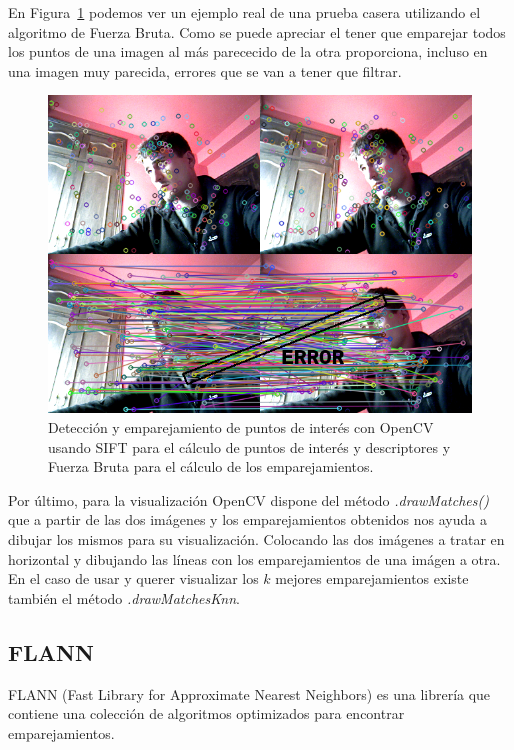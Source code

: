 En Figura~\ref{fig:SiftDetector} podemos ver un ejemplo real de una prueba casera utilizando el algoritmo de Fuerza Bruta. Como se puede apreciar el tener que emparejar todos los puntos de una imagen al más parececido de la otra proporciona, incluso en una imagen muy parecida, errores que se van a tener que filtrar.

\begin{figure}[th]
\centering
\includegraphics[scale=0.8]{Figures/sift-detector.png}
\decoRule
\caption[Captura real con SIFT]{Detección y emparejamiento de puntos de interés con OpenCV usando SIFT para el cálculo de puntos de interés y descriptores y Fuerza Bruta para el cálculo de los emparejamientos.}
\label{fig:SiftDetector}
\end{figure}



Por último, para la visualización OpenCV dispone del método \textit{.drawMatches()} que a partir de las dos imágenes y los emparejamientos obtenidos nos ayuda a dibujar los mismos para su visualización. Colocando las dos imágenes a tratar en horizontal y dibujando las líneas con los emparejamientos de una imágen a otra. En el caso de usar y querer visualizar los $k$ mejores emparejamientos existe también el método \textit{.drawMatchesKnn}.


\subsection{FLANN}

FLANN (Fast Library for Approximate Nearest Neighbors) es una librería que contiene una colección de algoritmos optimizados para encontrar emparejamientos.

